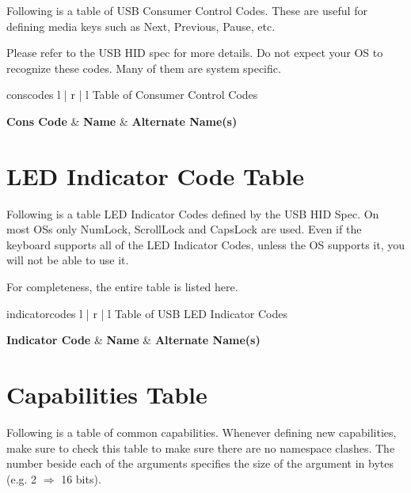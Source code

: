 \documentclass{kiibohd-template}
\begin{document}
Following is a table of USB Consumer Control Codes.
These are useful for defining media keys such as Next, Previous, Pause, etc.

Please refer to the USB HID spec for more details.
Do not expect your OS to recognize these codes.
Many of them are system specific.

\begin{ltable}{conscodes}{ l | r | l }{Table of Consumer Control Codes}

\textbf{Cons Code} & \textbf{Name} & \textbf{Alternate Name(s)} \\
\hline
\hline


\end{ltable}


\newpage
\chapter{LED Indicator Code Table}
\label{chpt:LEDIndicatorCodeTable}
Following is a table LED Indicator Codes defined by the USB HID Spec.
On most OSs only NumLock, ScrollLock and CapsLock are used.
Even if the keyboard supports all of the LED Indicator Codes, unless the OS supports it, you will not be able to use it.

For completeness, the entire table is listed here.

\begin{ltable}{indicatorcodes}{ l | r | l }{Table of USB LED Indicator Codes}

\textbf{Indicator Code} & \textbf{Name} & \textbf{Alternate Name(s)} \\
\hline
\hline


\end{ltable}


\newpage
\chapter{Capabilities Table}
\label{chpt:CapabilitiesTable}

Following is a table of common capabilities.
Whenever defining new capabilities, make sure to check this table to make sure there are no namespace clashes.
The number beside each of the arguments specifies the size of the argument in bytes (e.g. 2 $\Rightarrow$ 16 bits).
\end{document}

